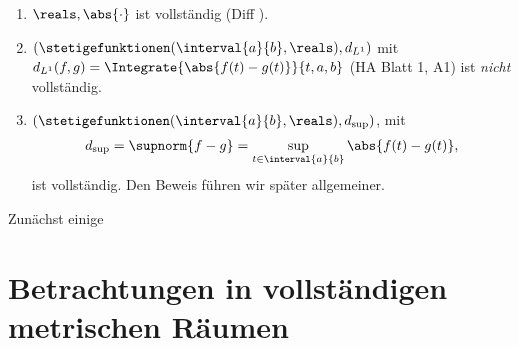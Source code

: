 \begin{beispiele}
    \begin{enumerate}
        
        \item \label{r_ist_vollstaendig} \( \reals ,\abs{\cdot} \) ist vollständig (Diff ).
        \item \label{integral_metrischer_raum_ist_nicht_vollstaendig} \( (\stetigefunktionen(\interval{a}{b} ,\reals), d_{L^1})\) mit \( d_{L^1}(f,g)=\Integrate{\abs{f(t)-g(t)}}{t,a,b}\) (\vgl HA Blatt 1, A1) ist \emph{nicht} vollständig. 
        \item \( (\stetigefunktionen(\interval{a}{b},\reals ), d_{\sup})\), mit
        \begin{align*}
            d_{\sup}=\supnorm{f-g}=\sup_{t\in \interval{a}{b}}\abs{f(t)-g(t)},
        \end{align*}
        ist vollständig.
        Den Beweis führen wir später allgemeiner.
    \end{enumerate}
    

\end{beispiele}
Zunächst einige 
\section*{Betrachtungen in vollständigen metrischen Räumen}

